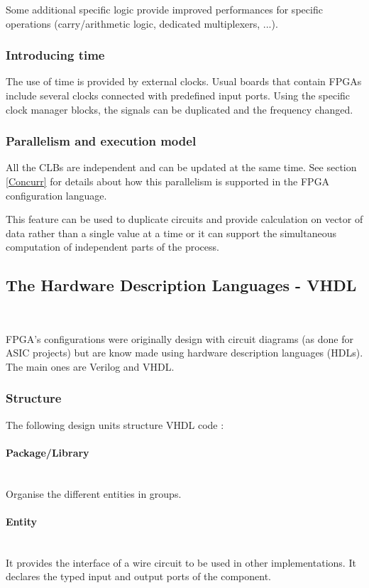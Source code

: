 \documentclass[10pt,a4paper]{article}
\renewcommand{\indent}{~\\\vspace{-.8cm}}
\begin{document}
Some additional specific logic provide improved performances for specific operations (carry/arithmetic logic, dedicated multiplexers, ...).

\subsubsection{Introducing time}

The use of time is provided by external clocks. Usual boards that contain FPGAs include several clocks connected with predefined input ports. Using the specific clock manager blocks, the signals can be duplicated and the frequency changed.

\subsubsection{Parallelism and execution model}

All the CLBs are independent and can be updated at the same time. See section \ref{Concurr}
for details about how this parallelism is supported in the FPGA configuration language.

This feature can be used to duplicate circuits and provide calculation on vector of data rather than a single value at a time or it can support the simultaneous computation of independent parts of the process.


\subsection{The Hardware Description Languages - VHDL}
\indent

FPGA's configurations were originally design with circuit diagrams (as done for ASIC projects) but are know made using hardware description languages (HDLs). The main ones are Verilog and VHDL.


\subsubsection{Structure}

The following design units structure VHDL code :

\paragraph{Package/Library}~\\
Organise the different entities in groups.

\paragraph{Entity}~\\
It provides the interface of a wire circuit to be used in other implementations. It declares the typed input and output ports of the component.
\end{document}
